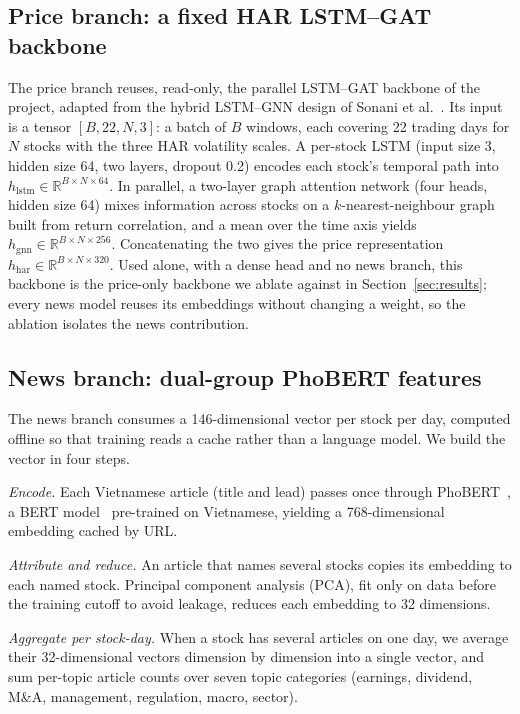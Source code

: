 \documentclass[runningheads]{llncs}
\begin{document}
\subsection{Price branch: a fixed HAR LSTM--GAT backbone}
The price branch reuses, read-only, the parallel LSTM--GAT backbone of the project, adapted from the
hybrid LSTM--GNN design of Sonani et al.~\cite{sonani2025}. Its input is a tensor
$[B,22,N,3]$: a batch of $B$ windows, each covering 22 trading days for $N$ stocks with the three
HAR volatility scales. A per-stock LSTM (input size 3, hidden size 64, two layers, dropout 0.2)
encodes each stock's temporal path into $h_{\text{lstm}}\in\mathbb{R}^{B\times N\times 64}$. In
parallel, a two-layer graph attention network (four heads, hidden size 64) mixes information across
stocks on a $k$-nearest-neighbour graph built from return correlation, and a mean over the time
axis yields $h_{\text{gnn}}\in\mathbb{R}^{B\times N\times 256}$. Concatenating the two gives the
price representation $h_{\text{har}}\in\mathbb{R}^{B\times N\times 320}$. Used alone, with a dense
head and no news branch, this backbone is the price-only backbone we ablate against in
Section~\ref{sec:results}; every news model reuses its embeddings without changing a weight, so the
ablation isolates the news contribution.

\subsection{News branch: dual-group PhoBERT features}
\label{sec:news}
The news branch consumes a 146-dimensional vector per stock per day, computed offline so that
training reads a cache rather than a language model. We build the vector in four steps.

\emph{Encode.} Each Vietnamese article (title and lead) passes once through
PhoBERT~\cite{phobert2020}, a BERT model~\cite{devlin2019} pre-trained on Vietnamese, yielding a
768-dimensional embedding cached by URL.

\emph{Attribute and reduce.} An article that names several stocks copies its embedding to each named
stock. Principal component analysis (PCA), fit only on data before the training cutoff to avoid
leakage, reduces each embedding to 32 dimensions.

\emph{Aggregate per stock-day.} When a stock has several articles on one day, we average their
32-dimensional vectors dimension by dimension into a single vector, and sum per-topic article counts
over seven topic categories (earnings, dividend, M\&A, management, regulation, macro, sector).
\end{document}
